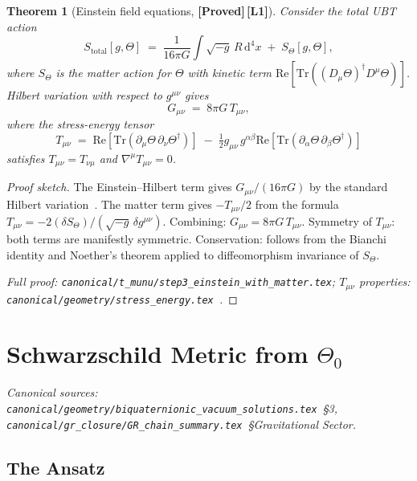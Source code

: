 \documentclass[12pt,a4paper]{article}
\newtheorem{theorem}{Theorem}[section]
\theoremstyle{definition}
\theoremstyle{remark}
\newcommand{\PROVED}{\textbf{[Proved]}}
\newcommand{\Lone}{\textbf{[L1]}}
\newcommand{\Tr}{\mathrm{Tr}}
\newcommand{\re}{\mathrm{Re}}
\begin{document}
\begin{theorem}[Einstein field equations, \PROVED\,\Lone]
\label{thm:einstein}
Consider the total UBT action
\[
  S_{\mathrm{total}}[g,\Theta]
  \;=\; \frac{1}{16\pi G}\int\!\!\sqrt{-g}\,R\,\mathrm{d}^4x
  \;+\; S_\Theta[g,\Theta],
\]
where $S_\Theta$ is the matter action for $\Theta$ with kinetic term
$\re[\Tr((D_\mu\Theta)^\dagger D^\mu\Theta)]$.
Hilbert variation with respect to $g^{\mu\nu}$ gives
\[
  G_{\mu\nu} \;=\; 8\pi G\,T_{\mu\nu},
\]
where the stress-energy tensor
\[
  T_{\mu\nu}
  \;=\; \re[\Tr(\partial_\mu\Theta\,\partial_\nu\Theta^\dagger)]
  \;-\; \tfrac{1}{2}g_{\mu\nu}\,g^{\alpha\beta}
        \re[\Tr(\partial_\alpha\Theta\,\partial_\beta\Theta^\dagger)]
\]
satisfies $T_{\mu\nu} = T_{\nu\mu}$ and $\nabla^\mu T_{\mu\nu} = 0$.
\end{theorem}

\begin{proof}[Proof sketch]
The Einstein--Hilbert term gives $G_{\mu\nu}/(16\pi G)$ by the standard
Hilbert variation~\cite{hilbert1915,wald1984}.
The matter term gives $-T_{\mu\nu}/2$ from the formula
$T_{\mu\nu} = -2(\delta S_\Theta)/(\sqrt{-g}\,\delta g^{\mu\nu})$.
Combining: $G_{\mu\nu} = 8\pi G\,T_{\mu\nu}$.
Symmetry of $T_{\mu\nu}$: both terms are manifestly symmetric.
Conservation: follows from the Bianchi identity and Noether's theorem applied
to diffeomorphism invariance of $S_\Theta$.

\medskip
\noindent\textit{Full proof:
\texttt{canonical/t\_munu/step3\_einstein\_with\_matter.tex};
$T_{\mu\nu}$ properties:
\texttt{canonical/geometry/stress\_energy.tex}~\cite{jaros2026_canonical}.}
\end{proof}

\section{Schwarzschild Metric from $\Theta_0$}
\label{sec:schwarzschild}

\noindent\textit{Canonical sources:
\texttt{canonical/geometry/biquaternionic\_vacuum\_solutions.tex}~\S3,
\texttt{canonical/gr\_closure/GR\_chain\_summary.tex}~\S{Gravitational Sector}.}

\subsection{The Ansatz}
\end{document}
